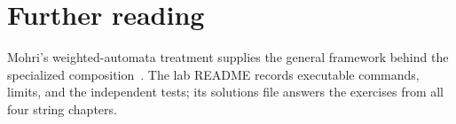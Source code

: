 \section{Further reading}
\label{sec:ch80-reading}
Mohri's weighted-automata treatment supplies the general framework behind the specialized composition~\cite{mohri-2009-weighted}.
The lab README records executable commands, limits, and the independent tests; its solutions file answers the exercises from all four string chapters.
